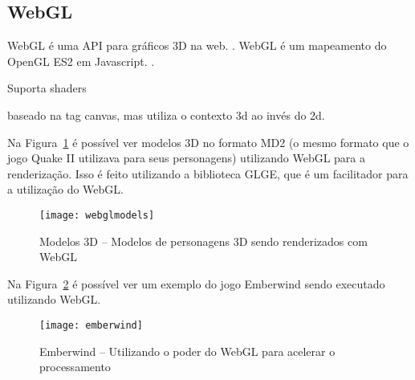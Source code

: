 \subsection{WebGL}

WebGL é uma API para gráficos 3D na web. \cite{lubbers2010pro}.
WebGL é um mapeamento do OpenGL ES2 em Javascript. \cite{lubbers2010pro}.

Suporta shaders

baseado na tag canvas, mas utiliza o contexto 3d ao invés do 2d.

Na Figura~\ref{img:webglmodels} é possível ver modelos 3D no formato
MD2 (o mesmo formato que o jogo Quake II utilizava para seus
personagens) utilizando WebGL para a renderização. Isso é feito utilizando a
biblioteca GLGE, que é um facilitador para a utilização do WebGL.

\begin{figure}[H]
  \centering
	\texttt{[image: webglmodels]}
  \caption{Modelos 3D {--} Modelos de personagens 3D sendo renderizados com WebGL}
  \label{img:webglmodels}
\end{figure}

\clearpage

Na Figura~\ref{img:emberwind} é possível ver um exemplo do jogo Emberwind
sendo executado utilizando WebGL.

\begin{figure}[H]
  \centering
	\texttt{[image: emberwind]}
  \caption{Emberwind {--} Utilizando o poder do WebGL para acelerar o processamento}
  \label{img:emberwind}
\end{figure}

\clearpage
